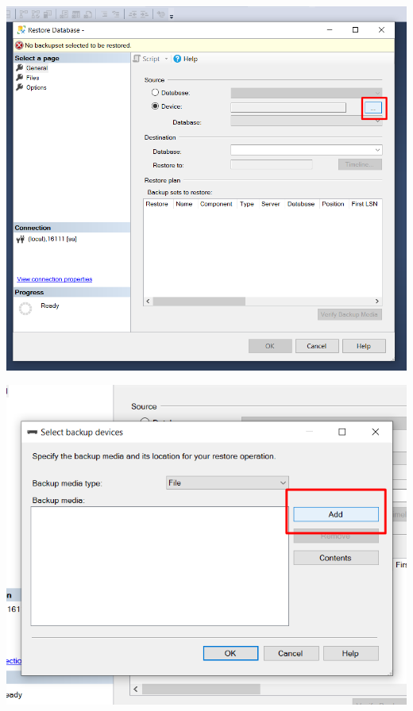 \documentclass{article}
\begin{document}
    \begin{center}
		\includegraphics[width=15cm]{./images/5} 
	\end{center}
	
    \begin{center}
		\includegraphics[width=15cm]{./images/6} 
	\end{center}
\end{document}
